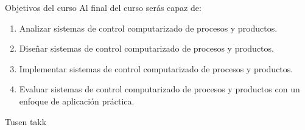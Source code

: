 \documentclass[presentation,aspectratio=169]{beamer}
\begin{document}
\begin{frame}[label={sec:org171452c}]{Objetivos del curso}
Al final del curso serás capaz de:

\begin{enumerate}
\item \alert{Analizar} sistemas de control computarizado de procesos y productos.
\item \alert{Diseñar} sistemas de control computarizado de procesos y productos.
\item \alert{Implementar} sistemas de control computarizado de procesos y productos.
\item \alert{Evaluar} sistemas de control computarizado de procesos y productos con un enfoque de aplicación práctica.
\end{enumerate}
\end{frame}

\begin{frame}[label={sec:orgc76446b}]{}
\Huge Tusen takk
\end{frame}
\end{document}
